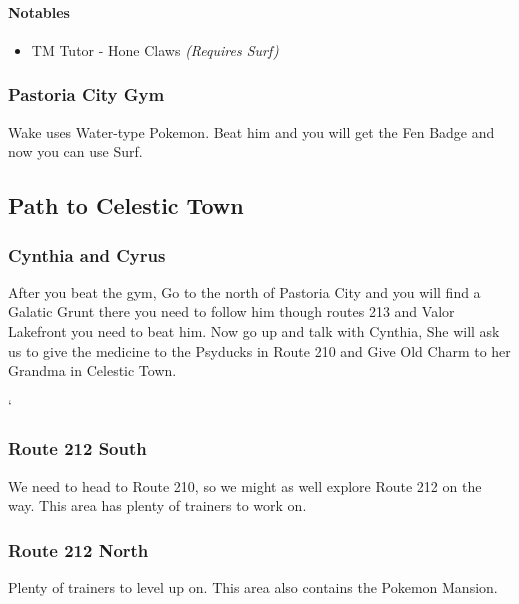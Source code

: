 \documentclass[11pt]{article}
\begin{document}
\paragraph{Notables}\label{par:notables-pastoria-city}

\begin{itemize}
    \item TM Tutor - Hone Claws \emph{(Requires Surf)}
\end{itemize}

\subsubsection{Pastoria City Gym}\label{subsubsec:pastoria-city-gym}
Wake uses Water-type Pokemon.
Beat him and you will get the Fen Badge and now you can use Surf.

\subsection{Path to Celestic Town}\label{subsec:path-to-celestic-town}

\subsubsection{Cynthia and Cyrus}\label{subsubsec:cynthia-and-cyrus}
After you beat the gym, Go to the north of Pastoria City
and you will find a Galatic Grunt there you need to follow him though routes 213
and Valor Lakefront you need to beat him.
Now go up and talk with Cynthia, She will ask us to give the medicine to the
Psyducks in Route 210 and Give Old Charm to her Grandma in Celestic Town.

`


\subsubsection{Route 212 South}\label{subsubsec:route-212-(south)}
We need to head to Route 210, so we might as well explore Route 212 on the way.
This area has plenty of trainers to work on.





\subsubsection{Route 212 North}\label{subsubsec:route-212-north}
Plenty of trainers to level up on.
This area also contains the Pokemon Mansion.
\end{document}
